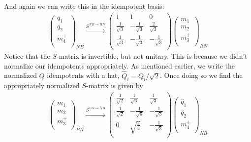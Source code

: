 And again we can write this in the idempotent basis:
\begin{align}
\left( \begin{matrix}
{q}_1\\
{q}_2\\
m_4^+\\
\end{matrix} \right)_{NB}
\xrightarrow{S^{NB \rightarrow BN}}
\left( \begin{matrix}
1& 1& 0 \\
\frac{1}{\sqrt{3}} & - \frac{1}{\sqrt{3}} & \frac{2}{\sqrt{3}} \\
\frac{1}{\sqrt{3}} & - \frac{1}{\sqrt{3}} & - \frac{1}{\sqrt{3}} \\
\end{matrix} \right)
\left( \begin{matrix}
{m}_1\\
{m}_2\\
m_3^+\\
\end{matrix} \right)_{BN}
\end{align}
Notice that the $S$-matrix is invertible, but not unitary. 
This is because we didn't normalize our idempotents appropriately. 
As mentioned earlier, we write the normalized $Q$ idempotents with a hat, $\widehat{Q}_i = Q_i /\sqrt{2}$.
Once doing so we find the appropriately normalized $S$-matrix is given by
\begin{align}\left( \begin{matrix}
{m}_1\\
{m}_2\\
m_3^+\\
\end{matrix} \right)_{BN}
\xrightarrow{S^{BN \rightarrow NB}}
\left( \begin{matrix}
\frac{1}{\sqrt{2}} & \frac{1}{\sqrt{6}} &  \frac{1}{\sqrt{3}} \\
\frac{1}{\sqrt{2}} & - \frac{1}{\sqrt{6}} & -\frac{1}{\sqrt{3}} \\
0& \sqrt{\frac{2}{3}} & -\frac{1}{\sqrt{3}} \\
\end{matrix} \right)
\left( \begin{matrix}
\widehat{{q}}_1\\
\widehat{{q}}_2\\
m_4^+\\
\end{matrix} \right)_{NB}
\end{align}
